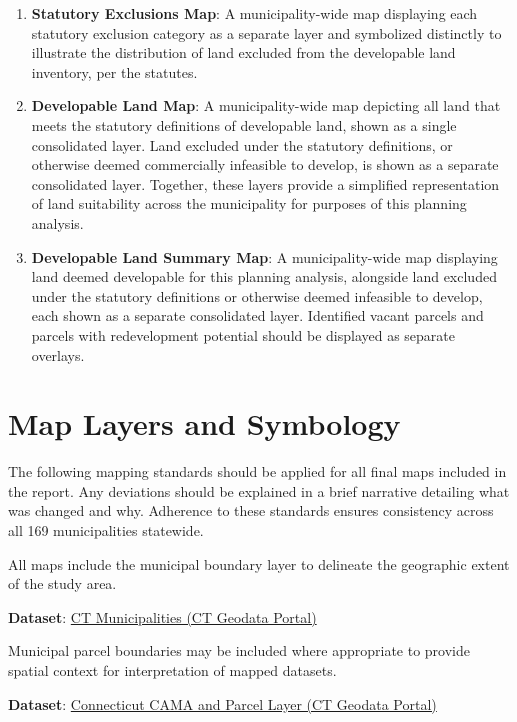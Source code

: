 \documentclass[
  letterpaper,
  DIV=11,
  numbers=noendperiod]{scrreprt}
\begin{document}
\begin{enumerate}
\def\labelenumi{\arabic{enumi}.}
\item
  \textbf{Statutory Exclusions Map}: A municipality-wide map displaying
  each statutory exclusion category as a separate layer and symbolized
  distinctly to illustrate the distribution of land excluded from the
  developable land inventory, per the statutes.
\item
  \textbf{Developable Land Map}: A municipality-wide map depicting all
  land that meets the statutory definitions of developable land, shown
  as a single consolidated layer. Land excluded under the statutory
  definitions, or otherwise deemed commercially infeasible to develop,
  is shown as a separate consolidated layer. Together, these layers
  provide a simplified representation of land suitability across the
  municipality for purposes of this planning analysis.
\item
  \textbf{Developable Land Summary Map}: A municipality-wide map
  displaying land deemed developable for this planning analysis,
  alongside land excluded under the statutory definitions or otherwise
  deemed infeasible to develop, each shown as a separate consolidated
  layer. Identified vacant parcels and parcels with redevelopment
  potential should be displayed as separate overlays.
\end{enumerate}

\section{Map Layers and Symbology}\label{map-layers-and-symbology}

The following mapping standards should be applied for all final maps
included in the report. Any deviations should be explained in a brief
narrative detailing what was changed and why. Adherence to these
standards ensures consistency across all 169 municipalities statewide.

All maps include the municipal boundary layer to delineate the
geographic extent of the study area.

\textbf{Dataset}:
\href{https://geodata.ct.gov/datasets/ctmaps::ct-municipalities-with-fips/about}{CT
Municipalities (CT Geodata Portal)}

Municipal parcel boundaries may be included where appropriate to provide
spatial context for interpretation of mapped datasets.

\textbf{Dataset}:
\href{https://geodata.ct.gov/datasets/ctmaps::connecticut-cama-and-parcel-layer/about}{Connecticut
CAMA and Parcel Layer (CT Geodata Portal)}
\end{document}

